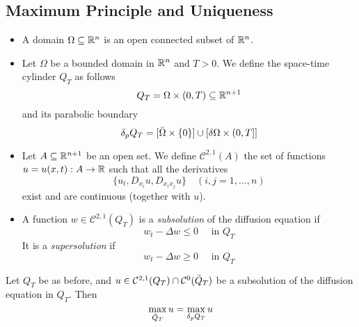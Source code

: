 \subsection{Maximum Principle and Uniqueness}
\begin{DefBox}
    \begin{Def}
        \begin{itemize}
            \item A domain $\Omega \subseteq \mathbb{R}^n$ is an open connected subset of $\mathbb{R}^n$.
            \item Let $\Omega$ be a bounded domain in $\mathbb{R}^n$ and $T>0$. We define the space-time cylinder $Q_T$ as follows
            \begin{equation*}
                Q_T = \Omega \times (0,T) \subseteq \mathbb{R}^{n+1}
            \end{equation*}
            and its parabolic boundary 
            \begin{equation*}
                \delta_pQ_T = [\Bar{\Omega} \times \{0\}] \cup [\delta \Omega \times (0,T]]
            \end{equation*}
            \item Let $A \subseteq \mathbb{R}^{n+1}$ be an open set. We define $\mathcal{C}^{2,1}(A)$ the set of functions $u = u(x,t): A \rightarrow \mathbb{R}$ such that all the derivatives 
            \begin{equation*}
                \{u_t, D_{x_i}u, D_{x_ix_j}u\} \quad (i,j = 1,\ldots,n) 
            \end{equation*}
            exist and are continuous (together with $u$). 
            \item A function $w \in \mathcal{C}^{2,1}(Q_T)$ is a \emph{subsolution} of the diffusion equation if 
            \begin{equation*}
                w_t - \Delta w \leq 0 \quad \text{ in } Q_T
            \end{equation*}
            It is a \emph{supersolution} if
            \begin{equation*}
                w_t - \Delta w \geq 0 \quad \text{ in } Q_T
            \end{equation*}
        \end{itemize}
    \end{Def}
\end{DefBox}
\begin{ThBox}
    \begin{Th}
    Let $Q_T$ be as before, and $u \in \mathcal{C}^{2,1}(Q_T) \cap \mathcal{C}^0(\Bar{Q}_T)$ be a subsolution of the diffusion equation in $Q_T$. Then
    \begin{equation*}
        \max_{\Bar{Q}_T} u= \max_{\delta_p Q_T} u 
    \end{equation*}
    \end{Th}
\end{ThBox}
